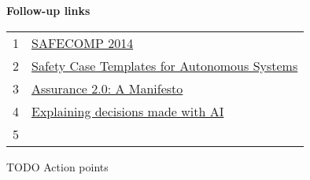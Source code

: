 \textbf{Follow-up links}
\vspace{0.23cm}

\begin{tabular}{ll}
1 & \href{https://bit.ly/3AOiM43}{SAFECOMP 2014} \\
2 & \href{https://arxiv.org/abs/2102.02625}{Safety Case Templates for Autonomous Systems} \\
3 & \href{https://arxiv.org/pdf/2004.10474.pdf}{Assurance 2.0: A Manifesto} \\
4 & \href{https://ico.org.uk/for-organisations/guide-to-data-protection/key-data-protection-themes/explaining-decisions-made-with-artificial-intelligence/}{Explaining decisions made with AI} \\
5 & 





\end{tabular}

TODO Action points

